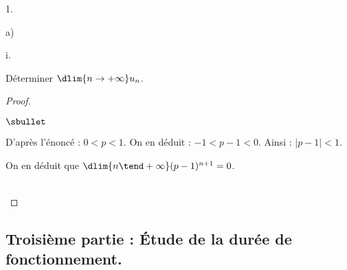 \documentclass[11pt]{article}%
\begin{document}
\begin{noliste}{1.}
\begin{noliste}{a)}
\begin{nonoliste}{i.}
    \item Déterminer $\dlim{n \to +\infty} u_n$. 

      \begin{proof}~%
        \begin{noliste}{$\sbullet$}
        \item D'après l'énoncé : $0 < p < 1$. On en déduit : $-1 < p-1
          < 0$. Ainsi : $|p - 1| < 1$.

        \item On en déduit que $\dlim{n \tend +\infty} (p-1)^{n+1} =
          0$.
        \end{noliste}
        ~\\[-1cm] 
      \end{proof}

    \end{nonoliste}
  \end{noliste}
\end{noliste}

\subsection*{Troisième partie : Étude de la durée de fonctionnement.}
\end{document}
